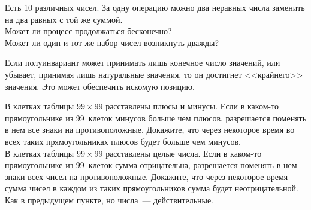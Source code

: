 \begin{problems}

\item
Есть 10 различных чисел.
За одну операцию можно два неравных числа заменить на два равных с той же
суммой.
\\
\subproblem
Может ли процесс продолжаться бесконечно?
\\
\subproblem
Может ли один и тот же набор чисел возникнуть дважды?

\end{problems}

Если полуинвариант может принимать лишь конечное число значений, или убывает,
принимая лишь натуральные значения, то он достигнет <<крайнего>> значения.
Это может обеспечить искомую позицию.

\begin{problems}

\item
\subproblem
В клетках таблицы $99 \times 99$ расставлены плюсы и минусы.
Если в каком-то прямоугольнике из 99~клеток минусов больше чем плюсов,
разрешается поменять в нем все знаки на противоположные.
Докажите, что через некоторое время во всех таких прямоугольниках плюсов будет
больше чем минусов.
\\
\subproblem
В клетках таблицы $99 \times 99$ расставлены целые числа.
Если в каком-то прямоугольнике из 99~клеток сумма отрицательна, разрешается
поменять в нем знаки всех чисел на противоположные.
Докажите, что через некоторое время сумма чисел в каждом из таких
прямоугольников сумма будет неотрицательной.
\\
\subproblem
Как в предыдущем пункте, но числа~--- действительные.

\end{problems}

